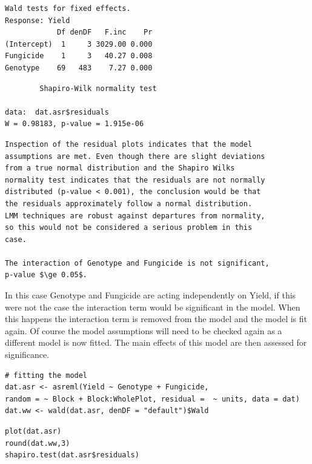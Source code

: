 \documentclass[a4paper, 10pt, fleqn, twosided]{memoir}
\begin{document}
\begin{tcolorbox}[title = Example 5 Shapiro-Wilk normality test output]
\begin{verbatim}
Wald tests for fixed effects.
Response: Yield
            Df denDF   F.inc    Pr
(Intercept)  1     3 3029.00 0.000
Fungicide    1     3   40.27 0.008
Genotype    69   483    7.27 0.000

\end{verbatim}

\tcblower

\begin{verbatim}
        Shapiro-Wilk normality test

data:  dat.asr$residuals
W = 0.98183, p-value = 1.915e-06
\end{verbatim}
\end{tcolorbox}

\begin{tcolorbox}[title = Example 5 Output Interpretation]
\begin{verbatim}
Inspection of the residual plots indicates that the model
assumptions are met. Even though there are slight deviations
from a true normal distribution and the Shapiro Wilks
normality test indicates that the residuals are not normally
distributed (p-value < 0.001), the conclusion would be that
the residuals approximately follow a normal distribution.
LMM techniques are robust against departures from normality,
so this would not be considered a serious problem in this
case.

The interaction of Genotype and Fungicide is not significant,
p-value $\ge 0.05$.
\end{verbatim}
\end{tcolorbox}

In this case Genotype and Fungicide are acting independently on Yield, if this
were not the case the interaction term would be significant in the model. When
this  happens the interaction term is removed from the model and the model is
fit again. Of course the model assumptions will need to be checked again as a
different model is now fitted. The main effects of this model are then assessed
for significance.

\begin{tcolorbox}[title = Fitting the linear model for a Split-plot Design]
\begin{verbatim}
# fitting the model
dat.asr <- asreml(Yield ~ Genotype + Fungicide,
random = ~ Block + Block:WholePlot, residual =  ~ units, data = dat)
dat.ww <- wald(dat.asr, denDF = "default")$Wald
\end{verbatim}

\tcblower
\begin{verbatim}
plot(dat.asr)
round(dat.ww,3)
shapiro.test(dat.asr$residuals)
\end{verbatim}
\end{tcolorbox}
\end{document}
